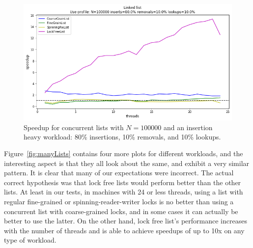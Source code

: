 \documentclass[11pt]{article}
\begin{document}
\begin{figure}[h]
\centering
\includegraphics[width=1.0\linewidth]{figs/lateday/combined/lateday_combined_list_insert_80_lookup_10_removal_10}
\caption{
Speedup for concurrent lists with $N=100000$ and an insertion heavy workload:
80\% insertions, 10\% removals, and 10\% lookups.}
\label{fig:listInsertHeavy}
\end{figure}

Figure~\ref{fig:manyLists} contains four more plots for different workloads, and
the interesting aspect is that they all look about the same, and exhibit a very
similar pattern. It is clear that many of our expectations were incorrect. The
actual correct hypothesis was that lock free lists would perform better than the
other lists. At least in our tests,
in machines with 24 or less threads, using a list with regular fine-grained or
spinning-reader-writer locks is no better than using a concurrent list with
coarse-grained locks, and in some cases it can actually be better to use the latter.
On the other hand, lock free list's performance increases with the number
of threads and is able to achieve speedups of up to 10x on any type of workload.
\end{document}
